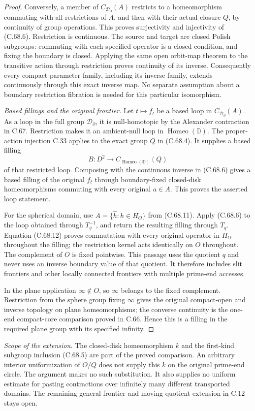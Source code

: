 \begin{proof}
Conversely, a member of
$C_{\mathcal D_\partial}(A)$ restricts to a
homeomorphism commuting with all restrictions
of $A$, and then with their actual closure
$Q$, by continuity of group operations.
This proves surjectivity and injectivity
of (C.68.6). Restriction is continuous.
The source and target are closed Polish
subgroups: commuting with each specified
operator is a closed condition, and fixing
the boundary is closed.
Applying the same open orbit-map theorem
to the transitive action through restriction
proves continuity of its inverse.
Consequently every compact parameter family,
including its inverse family, extends
continuously through this exact inverse map.
No separate assumption about a boundary
restriction fibration is needed for this
particular isomorphism.

\emph{Based fillings and the original frontier.}
Let $t\mapsto f_t$ be a based loop in
$C_{\mathcal D_\partial}(A)$.
As a loop in the full group
$\mathcal D_\partial$, it is null-homotopic
by the Alexander contraction in C.67.
Restriction makes it an ambient-null loop
in $\operatorname{Homeo}(\mathbb D)$.
The proper-action injection C.33 applies
to the exact group $Q$ in (C.68.4).
It supplies a based filling
\[
       B:D^2\longrightarrow
                    C_{\operatorname{Homeo}(\mathbb D)}(Q)
\]
of that restricted loop. Composing with
the continuous inverse in (C.68.6) gives
a based filling of the original $f_t$
through boundary-fixed closed-disk
homeomorphisms commuting with every
original $a\in A$.
This proves the asserted loop statement.

For the spherical domain, use
$A=\{\widehat h:h\in H_O\}$ from (C.68.11).
Apply (C.68.6) to the loop obtained through
$T_q^{-1}$, and return the resulting filling
through $T_q$. Equation (C.68.12) proves
commutation with every original operator
in $H_O$ throughout the filling; the
restriction kernel acts identically on
$O$ throughout. The complement of $O$
is fixed pointwise.
This passage uses the quotient $q$ and
never uses an inverse boundary value of
that quotient. It therefore includes slit
frontiers and other locally connected
frontiers with multiple prime-end accesses.

In the plane application $\infty\notin O$,
so $\infty$ belongs to the fixed complement.
Restriction from the sphere group fixing
$\infty$ gives the original compact-open
and inverse topology on plane homeomorphisms;
the converse continuity is the one-end
compact-core comparison proved in C.66.
Hence this is a filling in the required
plane group with its specified infinity.
\end{proof}

\emph{Scope of the extension.}
The closed-disk homeomorphism $k$ and the
first-kind subgroup inclusion (C.68.5) are
part of the proved comparison.
An arbitrary interior uniformization of
$O/Q$ does not supply this $k$ on the
original prime-end circle.
The argument makes no such substitution.
It also supplies no uniform estimate for
pasting contractions over infinitely many
different transported domains.
The remaining general frontier and
moving-quotient extension in C.12 stays open.
